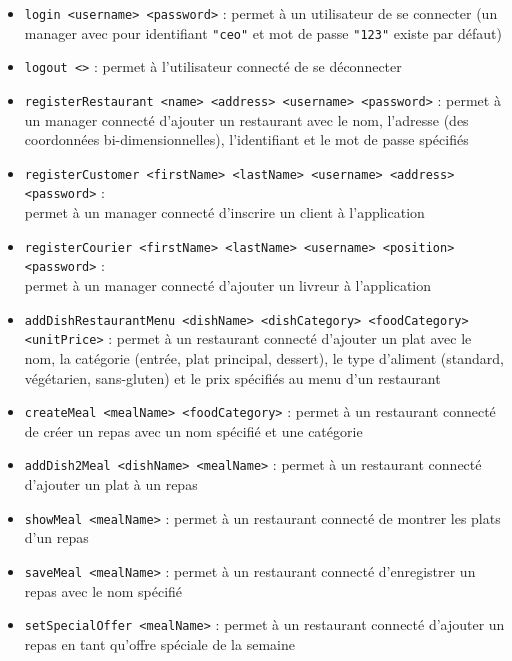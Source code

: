 \begin{itemize}
    \item \texttt{login <username> <password>} : permet à un utilisateur de se connecter (un manager avec pour identifiant \texttt{"ceo"} et mot de passe \texttt{"123"} existe par défaut)\\
    \item \texttt{logout <>} : permet à l'utilisateur connecté de se déconnecter\\
    \item \texttt{registerRestaurant <name> <address> <username> <password>} : permet à un manager connecté d'ajouter un restaurant avec le nom, l'adresse (des coordonnées bi-dimensionnelles), l'identifiant et le mot de passe spécifiés\\
    \item \texttt{registerCustomer <firstName> <lastName> <username> <address> <password>} :\\ permet à un manager connecté d'inscrire un client à l'application\\
    \item \texttt{registerCourier <firstName> <lastName> <username> <position> <password>} :\\ permet à un manager connecté d'ajouter un livreur à l'application\\
    \item \texttt{addDishRestaurantMenu <dishName> <dishCategory> <foodCategory> <unitPrice>} : permet à un restaurant connecté d'ajouter un plat avec le nom, la catégorie (entrée, plat principal, dessert), le type d'aliment (standard, végétarien, sans-gluten) et le prix spécifiés au menu d'un restaurant\\
    \item \texttt{createMeal <mealName> <foodCategory>} : permet à un restaurant connecté de créer un repas avec un nom spécifié et une catégorie\\
    \item \texttt{addDish2Meal <dishName> <mealName>} : permet à un restaurant connecté d'ajouter un plat à un repas\\
    \item \texttt{showMeal <mealName>} : permet à un restaurant connecté de montrer les plats d'un repas\\
    \item \texttt{saveMeal <mealName>} : permet à un restaurant connecté d'enregistrer un repas avec le nom spécifié\\
    \item \texttt{setSpecialOffer <mealName>} : permet à un restaurant connecté d'ajouter un repas en tant qu'offre spéciale de la semaine\\

\end{itemize}
